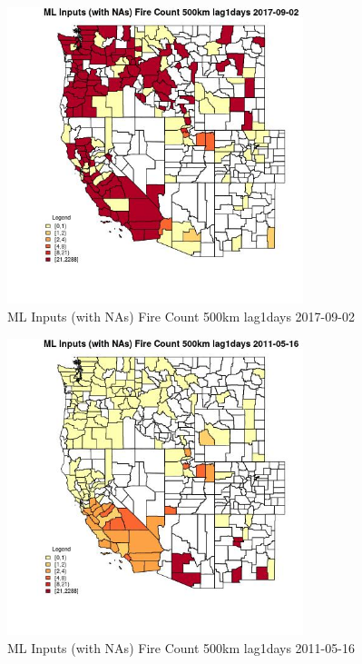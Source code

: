 \begin{figure} 
\centering  
\includegraphics[width=0.77\textwidth]{Code_Outputs/Report_ML_input_PM25_Step4_part_e_de_duplicated_aves_compiled_2019-05-21wNAs_CountyFire_Count_500km_lag1daysMean2017-09-02.jpg} 
\caption{\label{fig:Report_ML_input_PM25_Step4_part_e_de_duplicated_aves_compiled_2019-05-21wNAsCountyFire_Count_500km_lag1daysMean2017-09-02}ML Inputs (with NAs) Fire Count 500km lag1days 2017-09-02} 
\end{figure} 
 

\begin{figure} 
\centering  
\includegraphics[width=0.77\textwidth]{Code_Outputs/Report_ML_input_PM25_Step4_part_e_de_duplicated_aves_compiled_2019-05-21wNAs_CountyFire_Count_500km_lag1daysMean2011-05-16.jpg} 
\caption{\label{fig:Report_ML_input_PM25_Step4_part_e_de_duplicated_aves_compiled_2019-05-21wNAsCountyFire_Count_500km_lag1daysMean2011-05-16}ML Inputs (with NAs) Fire Count 500km lag1days 2011-05-16} 
\end{figure} 
 

